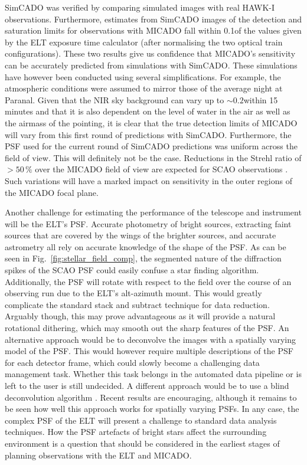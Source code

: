 SimCADO was verified by comparing simulated images with real HAWK-I observations. Furthermore, estimates from {SimCADO} images of the detection and saturation limits for observations with MICADO fall within 0.1\m of the values given by the ELT exposure time calculator (after normalising the two optical train configurations). These two results give us confidence that MICADO's sensitivity can be accurately predicted from simulations with SimCADO. These simulations have however been conducted using several simplifications. For example, the atmospheric conditions were assumed to mirror those of the average night at Paranal. Given that the NIR sky background can vary up to $\sim 0.2$\m within 15\,minutes \citep{moreels08} and that it is also dependent on the level of water in the air as well as the airmass of the pointing, it is clear that the true detection limits of MICADO will vary from this first round of predictions with SimCADO. Furthermore, the PSF used for the current round of SimCADO predictions was uniform across the field of view. This will definitely not be the case. Reductions in the Strehl ratio of $>50\,\%$ over the MICADO field of view are expected for SCAO observations \citep{clenet2015}. Such variations will have a marked impact on sensitivity in the outer regions of the MICADO focal plane.

Another challenge for estimating the performance of the telescope and instrument will be the ELT's PSF. Accurate photometry of bright sources, extracting faint sources that are covered by the wings of the brighter sources, and accurate astrometry all rely on accurate knowledge of the shape of the PSF. As can be seen in Fig.~\ref{fig:stellar_field_comp}, the segmented nature of the diffraction spikes of the SCAO PSF could easily confuse a star finding algorithm. Additionally, the PSF will rotate with respect to the field over the course of an observing run due to the ELT's alt-azimuth mount. This would greatly complicate the standard stack and subtract technique for data reduction. Arguably though, this may prove advantageous as it will provide a natural rotational dithering, which may smooth out the sharp features of the PSF. An alternative approach would be to deconvolve the images with a spatially varying model of the PSF. This would however require multiple descriptions of the PSF for each detector frame, which could slowly become a challenging data management task. Whether this task belongs in the automated data pipeline or is left to the user is still undecided. A different approach would be to use a blind deconvolution algorithm \citep{vorontsov2017}. Recent results are encouraging, although it remains to be seen how well this approach works for spatially varying PSFs. In any case, the complex PSF of the ELT will present a challenge to standard data analysis techniques. How the PSF artefacts of bright stars affect the surrounding environment is a question that should be considered in the earliest stages of planning observations with the ELT and MICADO.



